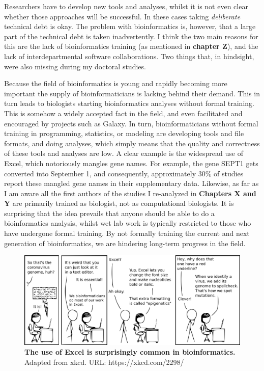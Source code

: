 Researchers have to develop new tools and analyses, whilst it is not even clear whether those approaches will be successful. In these cases taking \textit{deliberate} technical debt is okay. The problem with bioinformatics is, however, that a large part of the technical debt is taken inadvertently. I think the two main reasons for this are the lack of bioinformatics training (as mentioned in \textbf{chapter Z}), and the lack of interdepartmental software collaborations. Two things that, in hindsight, were also missing during my doctoral studies. 

Because the field of bioinformatics is young and rapidly becoming more important the supply of bioinformaticians is lacking behind their demand. This in turn leads to biologists starting bioinformatics analyses without formal training. This is somehow a widely accepted fact in the field, and even facilitated and encouraged by projects such as Galaxy\cite{galaxy}. In turn, bioinformaticians without formal training in programming, statistics, or modeling are developing tools and file formats, and doing analyses, which simply means that the quality and correctness of these tools and analyses are low. A clear example is the widespread use of Excel, which notoriously mangles gene names\cite{Zeeberg2004}. For example, the gene SEPT1 gets converted into September 1, and consequently, approximately $30\%$ of studies report these mangled gene names in their supplementary data\cite{Abeysooriya2021}. Likewise, as far as I am aware all the first authors of the studies I re-analyzed in \textbf{Chapters X and Y} are primarily trained as biologist, not as computational biologists. It is surprising that the idea prevails that anyone should be able to do a bioinformatics analysis, whilst wet lab work is typically restricted to those who have undergone formal training. By not formally training the current and next generation of bioinformatics, we are hindering long-term progress in the field.

\begin{figure}[H]
    \centering
    \includegraphics[width=0.85\linewidth]{ch.discussion/imgs/xkcd_excel.png}
    \caption{\textbf{The use of Excel is surprisingly common in bioinformatics.} Adapted from xkcd. URL: https://xkcd.com/2298/}
    \label{fig:xkcd_excel}
\end{figure}


